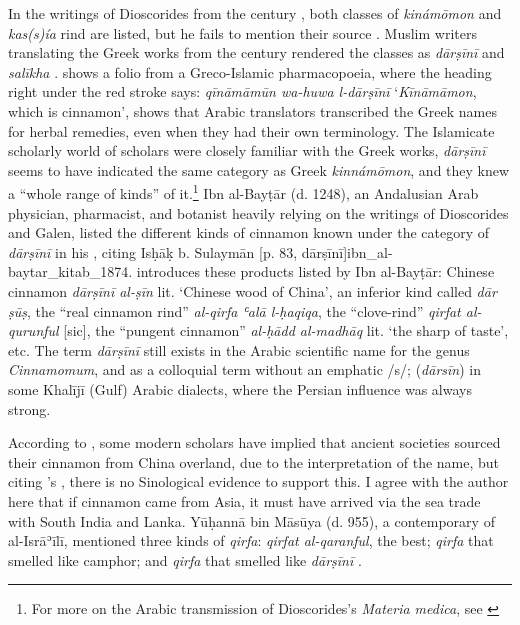 In the writings of Dioscorides from the  century \AD{}, both classes of  \textit{kinámōmon} and  \textit{kas(s)ía} rind are listed, but he fails to mention their source \parencite{alam_darcini_2011}. Muslim writers translating the Greek works from the  century rendered the classes as \textit{dārṣīnī} and \textit{salīkha} \parencite{alam_darcini_2011}.  shows a folio from a Greco-Islamic pharmacopoeia, where the heading right under the red stroke says: 
\textit{q\={i}n\={a}m\={a}m\={u}n wa-huwa l-d\={a}r\d{s}\={i}n\={i}} `\textit{Kīnāmāmon}, which is cinnamon', shows that Arabic translators transcribed the Greek names for herbal remedies, even when they had their own terminology. The Islamicate scholarly world of scholars were closely familiar with the Greek works, \textit{dārṣīnī} seems to have indicated the same category as Greek \textit{kinnámōmon}, and they knew a ``whole range of kinds'' of it.\footnote{For more on the Arabic transmission of Dioscorides's \textit{Materia medica}, see \textcite{gutas_arabic_2012}} Ibn al-Bayṭār (d. 1248), an Andalusian Arab physician, pharmacist, and botanist heavily relying on the writings of Dioscorides and Galen, listed the different kinds of cinnamon known under the category of \textit{dārṣīnī} in his , citing Isḥāḳ b. Sulaymān [p. 83, dārṣīnī]{ibn_al-baytar_kitab_1874}. \textcite{dietrich_dar_2004} introduces these products listed by Ibn al-Bayṭār: Chinese cinnamon \textit{dārṣīnī al-ṣīn} lit. `Chinese wood of China', an inferior kind called \textit{dār ṣūṣ}, the ``real cinnamon rind'' \textit{al-qirfa ʿalā l-ḥaqiqa}, the ``clove-rind'' \textit{qirfat al-qurunful} [sic], the ``pungent cinnamon'' \textit{al-ḥādd al-madhāq} lit. `the sharp of taste', etc. The term \textit{dārṣīnī} still exists in the Arabic scientific name for the genus \textit{Cinnamomum}, and as a colloquial term without an emphatic /s/;  (\textit{dārsīn}) in some Khalījī (Gulf) Arabic dialects, where the Persian influence was always strong.

According to \parencite{alam_darcini_2011}, some modern scholars have implied that ancient societies sourced their cinnamon from China overland, due to the interpretation of the name, but citing \textcite{laufer_sino-iranica_1919}'s , there is no Sinological evidence to support this. I agree with the author here that if cinnamon came from Asia, it must have arrived via the sea trade with South India and Lanka. Yūḥannā bin Māsūya (d. 955), a contemporary of al-Isrāʾīlī, mentioned three kinds of \textit{qirfa}: \textit{qirfat al-qaranful}, the best; \textit{qirfa} that smelled like camphor; and \textit{qirfa} that smelled like \textit{dārṣīnī} \parencite{alam_darcini_2011}.

